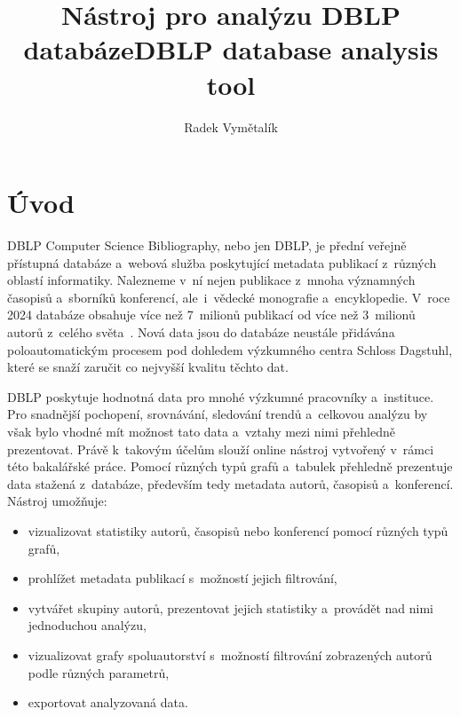 \documentclass[
  biblatex,
  sourcecodes,
  glossaries,
  index
]{kidiplom}
\title{Nástroj pro analýzu DBLP databáze}
\title[english]{DBLP database analysis tool}
\author{Radek Vymětalík}
\begin{document}
\maketitle



\newcommand{\BibLaTeX}{\textsc{Bib}\LaTeX}

\section{Úvod}

DBLP Computer Science Bibliography, nebo jen DBLP, je přední veřejně přístupná databáze a~webová služba poskytující metadata publikací z~různých oblastí informatiky. Nalezneme v~ní nejen publikace z~mnoha významných časopisů a~sborníků konferencí, ale~i~vědecké monografie a~encyklopedie. V~roce 2024 databáze obsahuje více než 7~milionů publikací od více než 3~milionů autorů z~celého světa~\cite{t00}. Nová data jsou do databáze neustále přidávána poloautomatickým procesem pod dohledem výzkumného centra Schloss Dagstuhl, které se snaží zaručit co nejvyšší kvalitu těchto dat.

DBLP poskytuje hodnotná data pro mnohé výzkumné pracovníky a~instituce. Pro snadnější pochopení, srovnávání, sledování trendů a~celkovou analýzu by však bylo vhodné mít možnost tato data a~vztahy mezi nimi přehledně prezentovat. Právě k~takovým účelům slouží online nástroj vytvořený v~rámci této bakalářské práce. Pomocí různých typů grafů a~tabulek přehledně prezentuje data stažená z~databáze, především tedy metadata autorů, časopisů a~konferencí. Nástroj umožňuje:
\begin{itemize}
\item vizualizovat statistiky autorů, časopisů nebo konferencí pomocí různých typů grafů,
\item prohlížet metadata publikací s~možností jejich filtrování,
\item vytvářet skupiny autorů, prezentovat jejich statistiky a~provádět nad nimi jednoduchou analýzu,
\item vizualizovat grafy spoluautorství s~možností filtrování zobrazených autorů podle různých parametrů,
\item exportovat analyzovaná data.
\end{itemize}
\end{document}
